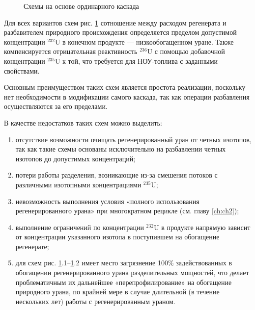 \begin{figure}[ht]
  \caption{Схемы на основе ординарного каскада}\label{fig:diagram1}
\end{figure}

Для всех вариантов схем рис. \ref{fig:diagram1} сотношение между расходом регенерата и разбавителем природного происхождения определяется пределом допустимой концентрации $^{232}$U в конечном продукте --- низкообогащенном уране. Также компенсируется отрицательная реактивность $^{236}$U с помощью добавочной концентрации $^{235}$U к той, что требуется для НОУ-топлива с заданными свойствами.

Основным преимуществом таких схем является простота реализации, поскольку нет необходимости в модификации самого каскада, так как операции разбавления осуществляются за его пределами.

В качестве недостатков таких схем можно выделить:
\begin{enumerate}
  \item отсутствие возможности очищать регенерированный уран от четных изотопов, так как такие схемы основаны исключительно на разбавлении четных изотопов до допустимых концентраций;
  \item потери работы разделения, возникающие из-за смешения потоков с различными изотопными концентрациями $^{235}$U;
  \item невозможность выполнения условия «полного использования регенерированного урана» при многократном рецикле \cite{smirnovApplyingEnrichmentCapacities2018} (см. главу \ref{ch:ch2});
  \item выполнение ограничений по концентрации $^{232}$U в продукте напрямую зависит от концентрации указанного изотопа в поступившем на обогащение регенерате;
  \item для схем рис. \ref{fig:diagram1}.1--\ref{fig:diagram1}.2 имеет место загрязнение 100\% задействованных в обогащении регенерированного урана разделительных мощностей, что делает проблематичным их дальнейшее «перепрофилирование» на обогащение природного урана, по крайней мере в случае длительной (в течение нескольких лет) работы с регенерированным ураном.
\end{enumerate}

